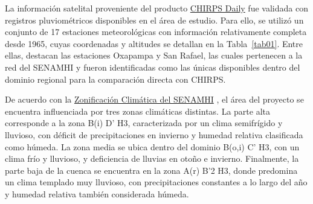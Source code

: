 La información satelital proveniente del producto
\href{https://data.chc.ucsb.edu/products/CHIRPS-2.0/}{CHIRPS Daily} fue validada
con registros pluviométricos disponibles en el área de estudio. Para ello, se
utilizó un conjunto de 17 estaciones meteorológicas con información
relativamente completa desde 1965, cuyas coordenadas y altitudes se detallan en
la Tabla~\ref{tab01}. Entre ellas, destacan las estaciones Oxapampa y San Rafael, las cuales
pertenecen a la red del SENAMHI y fueron identificadas como las únicas
disponibles dentro del dominio regional para la comparación directa con
CHIRPS.

De acuerdo con la
\href{https://www.senamhi.gob.pe/load/file/01404SENA-4.pdf}{Zonificación
Climática del SENAMHI} \parencite{senamhi2015}, el área del proyecto se
encuentra influenciada por tres zonas climáticas distintas. La parte alta
corresponde a la zona B(i) D' H3, caracterizada por un clima semifrígido y
lluvioso, con déficit de precipitaciones en invierno y humedad relativa
clasificada como húmeda. La zona media se ubica dentro del dominio B(o,i) C' H3,
con un clima frío y lluvioso, y deficiencia de lluvias en otoño e invierno.
Finalmente, la parte baja de la cuenca se encuentra en la zona A(r) B'2 H3,
donde predomina un clima templado muy lluvioso, con precipitaciones constantes a
lo largo del año y humedad relativa también considerada húmeda.

